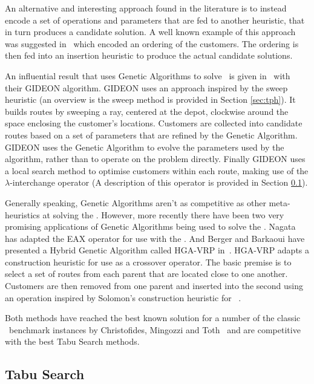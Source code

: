 An alternative and interesting approach found in the literature is to instead encode a set of operations and parameters that are fed to another heuristic, that in turn produces a candidate solution. A well known example of this approach was suggested in~\cite{BW:1993} which encoded an ordering of the customers. The ordering is then fed into an insertion heuristic to produce the actual candidate solutions.

An influential result that uses Genetic Algorithms to solve \VRPTW\ is given in~\cite{TNJ:1991} with their GIDEON algorithm. GIDEON uses an approach inspired by the sweep heuristic (an overview is the sweep method is provided in Section \ref{sec:tph}). It builds routes by sweeping a ray, centered at the depot, clockwise around the space enclosing the customer's locations. Customers are collected into candidate routes based on a set of parameters that are refined by the Genetic Algorithm. GIDEON uses the Genetic Algorithm to evolve the parameters used by the algorithm, rather than to operate on the problem directly. Finally GIDEON uses a local search method to optimise customers within each route, making use of the $\lambda$-interchange operator (A description of this operator is provided in Section \ref{sec:ts}).

Generally speaking, Genetic Algorithms aren't as competitive as other meta-heuristics at solving the \VRP. However, more recently there have been two very promising applications of Genetic Algorithms being used to solve the \VRP. Nagata~\cite{Nagata:2007} has adapted the EAX operator for use with the \VRP. And Berger and Barkaoui have presented a Hybrid Genetic Algorithm called HGA-VRP in~\cite{BM:2003}. HGA-VRP adapts a construction heuristic for use as a crossover operator. The basic premise is to select a set of routes from each parent that are located close to one another. Customers are then removed from one parent and inserted into the second using an operation inspired by Solomon's construction heuristic for \VRPTW~\cite{Solomon:1987}.

Both methods have reached the best known solution for a number of the classic \VRP\ benchmark instances by Christofides, Mingozzi and Toth~\cite{CMT:1981} and are competitive with the best Tabu Search methods.

\subsection{Tabu Search}
\label{sec:ts}

